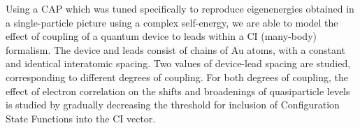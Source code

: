 Using a \acl{CAP} which was tuned specifically to reproduce eigenenergies
obtained in a single-particle picture using a complex self-energy, we are able
to model the effect of coupling of a quantum device to leads within a \ac{CI}
(many-body) formalism. The device and leads consist of chains of Au atoms, with
a constant and identical interatomic spacing. Two values of device-lead spacing
are studied, corresponding to different degrees of coupling. For both degrees
of coupling, the effect of electron correlation on the shifts and broadenings
of quasiparticle levels is studied by gradually decreasing the threshold for
inclusion of Configuration State Functions into the \ac{CI} vector.
